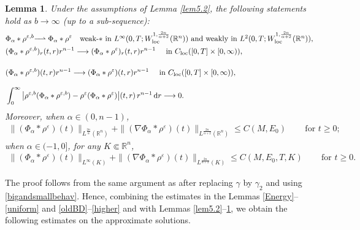 \documentclass[reqno,11pt]{amsart}
\numberwithin{equation}{section}
\newtheorem{lemma}[theorem]{Lemma}
\theoremstyle{definition}
\def\v{\varepsilon}
\def\dd{{\, \rm d}}
\newcommand{\longrightharpoonup}{\rm - \!\!\! \rightharpoonup}
\begin{document}
\begin{lemma}\label{lem5.1}
Under the assumptions of {\rm Lemma {\rm \ref{lem5.2}}}, the following statements hold as $b\rightarrow\infty$ {\rm(}up to a sub-sequence{\rm)}{\rm :}
\begin{align*}
&\Phi_\alpha*\rho^{\v,b} \longrightharpoonup \Phi_\alpha*\rho^\v \quad
	\mbox{weak-$\ast$ in $L^\infty(0,T; W^{1,\frac{2n}{\alpha +2}}_{\rm loc}(\mathbb{R}^n))$ and weakly in $L^2(0,T; W^{1,\frac{2n}{\alpha +2}}_{\rm loc}(\mathbb{R}^n))$},\\
	&(\Phi_\alpha*\rho^{\v,b})_r(t,r)r^{n-1} \longrightarrow (\Phi_\alpha*\rho^\v)_r(t,r)r^{n-1} \quad
	\mbox{ in $C_{\rm loc}([0,T]\times[0,\infty))$},  \\[4mm]
    &(\Phi_\alpha*\rho^{\v,b})(t,r)r^{n-1} \longrightarrow (\Phi_\alpha*\rho^\v)(t,r)r^{n-1} \quad
	\mbox{ in $C_{\rm loc}([0,T]\times[0,\infty))$}, \\[3mm]
    & \int_0^\infty \big|\rho^{\v,b} (\Phi_\alpha*\rho^{\v,b}) - \rho^{\v} (\Phi_\alpha*\rho^{\v})\big|(t,r)\,
    r^{n-1} \dd r \longrightarrow 0. 
\end{align*}
Moreover, when $\alpha \in (0,n-1)$,
\begin{align*}
	\|(\Phi_\alpha*\rho^\v)(t)\|_{L^{\frac{2n}{\alpha}}(\mathbb{R}^n)}
    +\|(\nabla \Phi_\alpha*\rho^\v)(t)\|_{L^\frac{2n}{\alpha + 2}(\mathbb{R}^n)}\leq C(M,E_0)\qquad\,\mbox{for $t\geq0$};
\end{align*}
when $\alpha \in (-1,0]$, for any $K \Subset \mathbb{R}^n$,
\begin{align*}
	\|(\Phi_\alpha*\rho^\v)(t)\|_{L^\infty(K)}
    +\|(\nabla \Phi_\alpha*\rho^\v)(t)\|_{L^\frac{2n}{\alpha + 2}(K)}
    \leq C(M,E_0,T,K)\qquad\,\mbox{for $t\geq0$}.
\end{align*}
\end{lemma}

The proof follows from the same argument as \cite[Lemma 3.9]{Carrillo2025} after 
replacing $\gamma$ by $\gamma_2$ and using \eqref{bigandsmallbehav}. 
Hence, combining the estimates in the Lemmas \ref{Energy}--\ref{uniform} and \ref{oldBD}--\ref{higher} 
and with 
Lemmas \ref{lem5.2}--\ref{lem5.1},
we obtain the following estimates on the approximate solutions.
\end{document}
